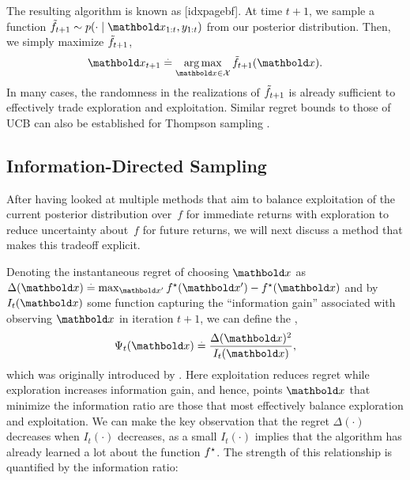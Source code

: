 The resulting algorithm is known as [idxpagebf].
At time $t+1$, we sample a function $\Tilde{f}_{t+1} \sim p(\cdot \mid \vx_{1:t}, y_{1:t})$ from our posterior distribution.
Then, we simply maximize $\Tilde{f}_{t+1}$, \begin{align}
  \vx_{t+1} \defeq \argmax_{\vx \in \spX} \Tilde{f}_{t+1}(\vx).
\end{align}
In many cases, the randomness in the realizations of $\Tilde{f}_{t+1}$ is already sufficient to effectively trade exploration and exploitation.
Similar regret bounds to those of UCB can also be established for Thompson sampling \citep{russo2016information,kandasamy2018parallelised}.

\subsection{Information-Directed Sampling}

After having looked at multiple methods that aim to balance exploitation of the current posterior distribution over~$f$ for immediate returns with exploration to reduce uncertainty about~$f$ for future returns, we will next discuss a method that makes this tradeoff explicit.

Denoting the instantaneous regret of choosing $\vx$ as $\Delta(\vx) \defeq \max_{\vxp} \opt{f}(\vxp) - \opt{f}(\vx)$ and by $I_t(\vx)$ some function capturing the ``information gain'' associated with observing $\vx$ in iteration $t+1$, we can define the , \begin{align}
  \Psi_t(\vx) \defeq \frac{\Delta(\vx)^2}{I_t(\vx)}, \label{eq:regret_information_ratio}
\end{align} which was originally introduced by \cite{russo2016information}.
Here exploitation reduces regret while exploration increases information gain, and hence, points $\vx$ that minimize the information ratio are those that most effectively balance exploration and exploitation.
We can make the key observation that the regret $\Delta(\cdot)$ decreases when $I_t(\cdot)$ decreases, as a small $I_t(\cdot)$ implies that the algorithm has already learned a lot about the function $f^\star$.
The strength of this relationship is quantified by the information ratio:


